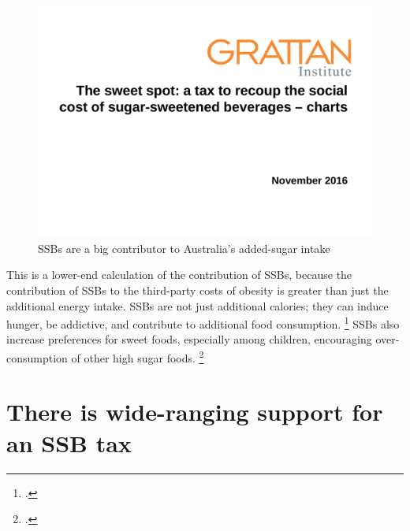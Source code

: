 \documentclass[embargoed]{grattan}
\begin{document}
\begin{figure}
\caption{SSBs are a big contributor to Australia's added-sugar intake} \label{fig:SSBs-are-a-big-contributor-to-Austs-added-sugar-intake}

\includegraphics[page=10]{atlas/ObesityCharts}

\end{figure}

This is a lower-end calculation of the contribution of SSBs, because the contribution of SSBs to the third-party costs of obesity is greater than just the additional energy intake.
SSBs are not just additional calories; they can induce hunger, be addictive, and contribute to additional food consumption.%
\footcites{Vartanian2007Effectssoftdrink}{Lennerz2013Effectsdietaryglycemic}{Schulte2015Currentconsiderationsregarding}{Fortuna2012obesityepidemicfood}{Popkin2012Sugarybeveragesrepresent}{Panel2014POLICYBRIEFoptions} SSBs also increase preferences for sweet foods, especially among children, encouraging over-consumption of other high sugar foods.%
\footcite{Popkin2012Sugarybeveragesrepresent}

\section{There is wide-ranging support for an SSB tax}\label{there-is-wide-ranging-support-for-an-ssb-tax}
\end{document}
